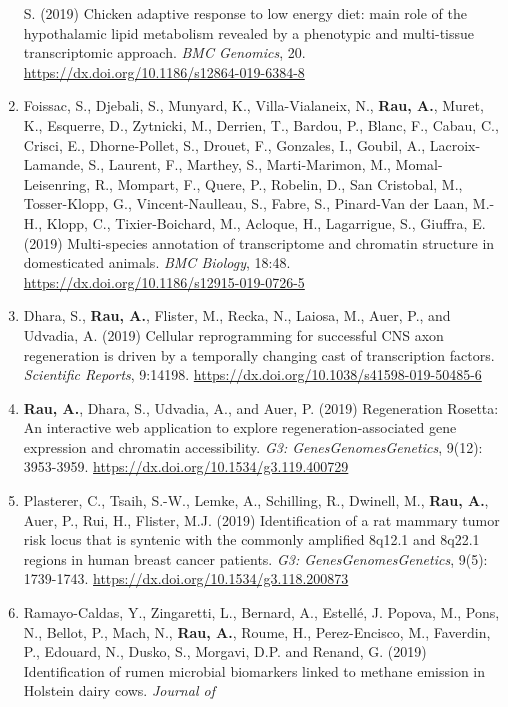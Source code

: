 \documentclass[11pt, a4paper]{awesome-cv}
\begin{document}
\begin{enumerate}
  S. (2019) Chicken adaptive response to low energy diet: main role of
  the hypothalamic lipid metabolism revealed by a phenotypic and
  multi-tissue transcriptomic approach. \emph{BMC Genomics}, 20.
  \url{https://dx.doi.org/10.1186/s12864-019-6384-8}
\item
  Foissac, S., Djebali, S., Munyard, K., Villa-Vialaneix, N.,
  \textbf{Rau, A.}, Muret, K., Esquerre, D., Zytnicki, M., Derrien, T.,
  Bardou, P., Blanc, F., Cabau, C., Crisci, E., Dhorne-Pollet, S.,
  Drouet, F., Gonzales, I., Goubil, A., Lacroix-Lamande, S., Laurent,
  F., Marthey, S., Marti-Marimon, M., Momal-Leisenring, R., Mompart, F.,
  Quere, P., Robelin, D., San Cristobal, M., Tosser-Klopp, G.,
  Vincent-Naulleau, S., Fabre, S., Pinard-Van der Laan, M.-H., Klopp,
  C., Tixier-Boichard, M., Acloque, H., Lagarrigue, S., Giuffra, E.
  (2019) Multi-species annotation of transcriptome and chromatin
  structure in domesticated animals. \emph{BMC Biology}, 18:48.
  \url{https://dx.doi.org/10.1186/s12915-019-0726-5}
\item
  Dhara, S., \textbf{Rau, A.}, Flister, M., Recka, N., Laiosa, M., Auer,
  P., and Udvadia, A. (2019) Cellular reprogramming for successful CNS
  axon regeneration is driven by a temporally changing cast of
  transcription factors. \emph{Scientific Reports}, 9:14198.
  \url{https://dx.doi.org/10.1038/s41598-019-50485-6}
\item
  \textbf{Rau, A.}, Dhara, S., Udvadia, A., and Auer, P. (2019)
  Regeneration Rosetta: An interactive web application to explore
  regeneration-associated gene expression and chromatin accessibility.
  \emph{G3: Genes\textbar Genomes\textbar Genetics}, 9(12): 3953-3959.
  \url{https://dx.doi.org/10.1534/g3.119.400729}
\item
  Plasterer, C., Tsaih, S.-W., Lemke, A., Schilling, R., Dwinell, M.,
  \textbf{Rau, A.}, Auer, P., Rui, H., Flister, M.J. (2019)
  Identification of a rat mammary tumor risk locus that is syntenic with
  the commonly amplified 8q12.1 and 8q22.1 regions in human breast
  cancer patients. \emph{G3: Genes\textbar Genomes\textbar Genetics},
  9(5): 1739-1743. \url{https://dx.doi.org/10.1534/g3.118.200873}
\item
  Ramayo-Caldas, Y., Zingaretti, L., Bernard, A., Estellé, J. Popova,
  M., Pons, N., Bellot, P., Mach, N., \textbf{Rau, A.}, Roume, H.,
  Perez-Encisco, M., Faverdin, P., Edouard, N., Dusko, S., Morgavi, D.P.
  and Renand, G. (2019) Identification of rumen microbial biomarkers
  linked to methane emission in Holstein dairy cows. \emph{Journal of
}
\end{enumerate}
\end{document}
